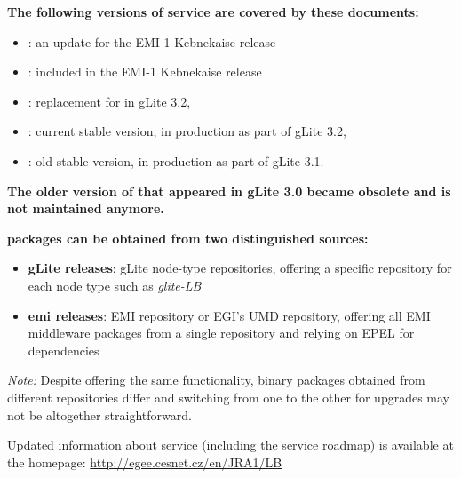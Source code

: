 \textbf{The following versions of \LB service are covered by these documents:}
\begin{itemize}
\item {}: an update for the EMI-1 Kebnekaise release
\item {}: included in the EMI-1 Kebnekaise release
\item {}: replacement for  in gLite 3.2,
\item {}: current stable version, in production as part of gLite 3.2,
\item {}: old stable version, in production as part of gLite 3.1.
\end{itemize}
\textbf{The older version of \LB that appeared in gLite 3.0 became obsolete and is not maintained anymore.}

\textbf{\LB packages can be obtained from two distinguished sources:}

\begin{itemize}
\item \textbf{gLite releases}: gLite node-type repositories, offering a specific repository for each node type such as \emph{glite-LB}
\item \textbf{emi releases}: EMI repository or EGI's UMD repository, offering all EMI middleware packages from a single repository and relying on EPEL for dependencies
\end{itemize}

\emph{Note:} Despite offering the same functionality, binary packages obtained from different repositories differ and switching from one to the other for upgrades may not be altogether straightforward.

Updated information about \LB service (including the \LB service roadmap) is available at the
\LB homepage:
\href{http://egee.cesnet.cz/en/JRA1/LB}{http://egee.cesnet.cz/en/JRA1/LB}

